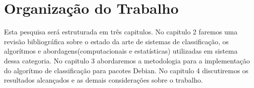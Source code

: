 \section{Organização do Trabalho}

        Esta pesquisa será estruturada em três capitulos. No capitulo 2 faremos uma revisão bibliográfica sobre o estado da arte de sistemas de classificação, os algorítmos e abordagens(computacionais e estatísticas) utilizadas em sistema dessa categoria. No capitulo 3 abordaremos a metodologia para a implementação do algorítmo de classificação para pacotes Debian. No capitulo 4 discutiremos os resultados alcançados e as demais considerações sobre o trabalho.
